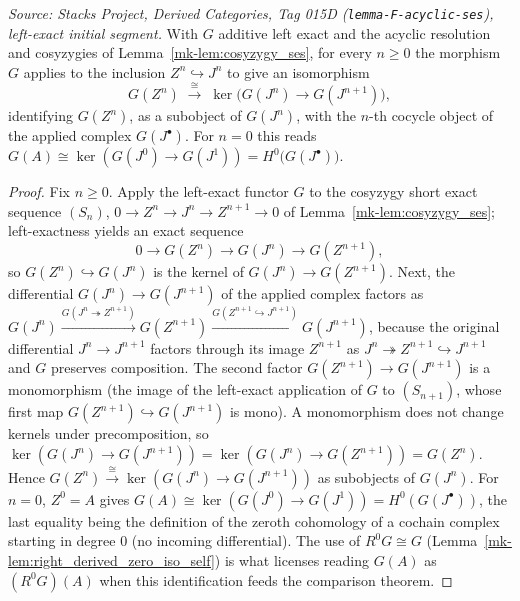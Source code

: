 \begin{lemma}
  \label{mk-lem:applied_cosyzygy_cycles}

  \textit{Source: Stacks Project, Derived Categories, Tag 015D
  (\texttt{lemma-F-acyclic-ses}), left-exact initial segment.}
  With \(G\) additive left exact and the acyclic resolution and cosyzygies of
  Lemma~\ref{mk-lem:cosyzygy_ses}, for every \(n \geq 0\) the morphism \(G\) applies to
  the inclusion \(Z^n \hookrightarrow J^n\) to give an isomorphism
  \[
    G(Z^n) \;\xrightarrow{\ \cong\ }\; \ker\bigl(G(J^n) \to G(J^{n+1})\bigr),
  \]
  identifying \(G(Z^n)\), as a subobject of \(G(J^n)\), with the \(n\)-th cocycle
  object of the applied complex \(G(J^\bullet)\). For \(n = 0\) this reads
  \(G(A) \cong \ker(G(J^0) \to G(J^1)) = H^0\bigl(G(J^\bullet)\bigr)\).
\end{lemma}

\begin{proof}
  Fix \(n \geq 0\). Apply the left-exact functor \(G\) to the cosyzygy short exact
  sequence \((S_n)\), \(0 \to Z^n \to J^n \to Z^{n+1} \to 0\) of
  Lemma~\ref{mk-lem:cosyzygy_ses}; left-exactness yields an exact sequence
  \[
    0 \longrightarrow G(Z^n) \longrightarrow G(J^n) \longrightarrow G(Z^{n+1}),
  \]
  so \(G(Z^n) \hookrightarrow G(J^n)\) is the kernel of \(G(J^n) \to G(Z^{n+1})\).
  Next, the differential \(G(J^n) \to G(J^{n+1})\) of the applied complex factors as
  \(G(J^n) \xrightarrow{G(J^n \twoheadrightarrow Z^{n+1})} G(Z^{n+1})
  \xrightarrow{G(Z^{n+1} \hookrightarrow J^{n+1})} G(J^{n+1})\), because the original
  differential \(J^n \to J^{n+1}\) factors through its image \(Z^{n+1}\) as
  \(J^n \twoheadrightarrow Z^{n+1} \hookrightarrow J^{n+1}\) and \(G\) preserves
  composition. The second factor \(G(Z^{n+1}) \to G(J^{n+1})\) is a monomorphism (the
  image of the left-exact application of \(G\) to \((S_{n+1})\), whose first map
  \(G(Z^{n+1}) \hookrightarrow G(J^{n+1})\) is mono). A monomorphism does not change
  kernels under precomposition, so
  \(\ker(G(J^n) \to G(J^{n+1})) = \ker(G(J^n) \to G(Z^{n+1})) = G(Z^n)\). Hence
  \(G(Z^n) \xrightarrow{\cong} \ker(G(J^n) \to G(J^{n+1}))\) as subobjects of
  \(G(J^n)\). For \(n = 0\), \(Z^0 = A\) gives
  \(G(A) \cong \ker(G(J^0) \to G(J^1)) = H^0(G(J^\bullet))\), the last equality being
  the definition of the zeroth cohomology of a cochain complex starting in degree
  \(0\) (no incoming differential). The use of \(R^0 G \cong G\)
  (Lemma~\ref{mk-lem:right_derived_zero_iso_self}) is what licenses reading \(G(A)\) as
  \((R^0 G)(A)\) when this identification feeds the comparison theorem.
\end{proof}

